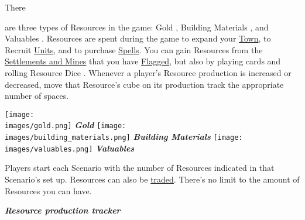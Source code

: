 
\begin{multicols}{2}

\hypertarget{Resources}{There} are three types of Resources in the game: Gold , Building Materials , and Valuables .
Resources are spent during the game to expand your \hyperlink{Town}{Town}, to Recruit \hyperlink{Units}{Units}, and to purchase \hyperlink{spells}{Spells}.
You can gain Resources from the \hyperlink{Mines}{Settlements and Mines} that you have \hyperlink{Categories}{Flagged}, but also by playing cards and rolling Resource Dice .
Whenever a player's Resource production is increased or decreased, move that Resource's cube on its production track the appropriate number of spaces.\par
\begin{multicols}{3}
  \centering
  \vspace*{\fill}
  \texttt{[image: \\images/gold.png]}
  \footnotesize\textcolor{darkcandyapplered}{\textit{\textbf{Gold \phantom{Materials}}}}
  \columnbreak
  \vspace*{\fill}
  \texttt{[image: \\images/building\_materials.png]}
  \footnotesize\textcolor{darkcandyapplered}{\textit{\textbf{Building Materials}}}
  \columnbreak
  \vspace*{\fill}
  \texttt{[image: \\images/valuables.png]}
  \footnotesize\textcolor{darkcandyapplered}{\textit{\textbf{Valuables \phantom{Materials}}}}
\end{multicols}
Players start each Scenario with the number of Resources indicated in that Scenario’s set up.
Resources can also be \hyperlink{Trading}{traded}.
There's no limit to the amount of Resources you can have.

\vspace*{\fill}

\columnbreak

\smallskip
\centering\footnotesize\textcolor{darkcandyapplered}{\textbf{\textit{Resource production tracker}}}
\bigskip


\end{multicols}

